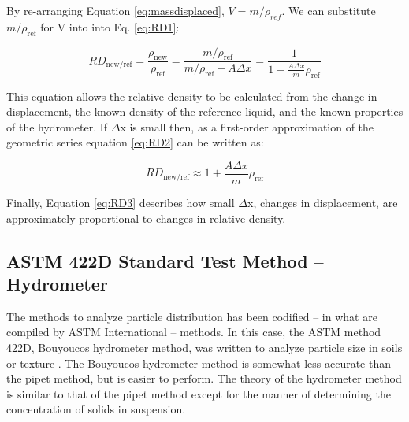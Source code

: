 \documentclass{tufte-handout}
\begin{document}
\noindent By re-arranging Equation \ref{eq:massdisplaced}, $V = m/\rho_{ref}$. We can substitute $m/\rho_\mathrm{ref}$ for V into into Eq. \ref{eq:RD1}:

\begin{equation}\label{eq:RD2}
RD_{\mathrm{new/ref}} = \frac{\rho_\mathrm{new}}{\rho_\mathrm{ref}} = \frac{m/\rho_\mathrm{ref}}{m/\rho_\mathrm{ref} - A \Delta x} = \frac{1}{1 - \frac{A \Delta x}{m} \rho_\mathrm{ref}}
\end{equation}

This equation allows the relative density to be calculated from the change in displacement, the known density of the reference liquid, and the known properties of the hydrometer. If $\Delta$x is small then, as a first-order approximation of the geometric series equation \ref{eq:RD2} can be written as:

\begin{equation}\label{eq:RD3}
RD_\mathrm{new/ref} \approx 1 + \frac{A \Delta x}{m} \rho_\mathrm{ref}
\end{equation}

Finally, Equation \ref{eq:RD3} describes how small $\Delta$x, changes in displacement, are approximately proportional to changes in relative density.



\subsection{ASTM 422D Standard Test Method -- Hydrometer}

The methods to analyze particle distribution has been codified -- in what are compiled by ASTM International -- methods. In this case, the ASTM method 422D, Bouyoucos hydrometer method, was written to analyze particle size in soils or texture \citep{standard2007d422}. The Bouyoucos hydrometer method is somewhat less accurate than the pipet method, but is easier to perform.  The theory of the hydrometer method is similar to that of the pipet method except for the manner of determining the concentration of solids in suspension.  
\end{document}
